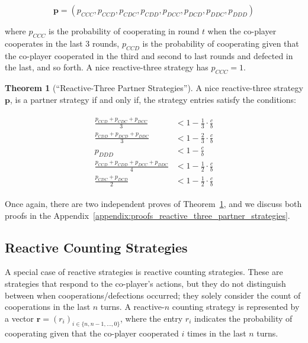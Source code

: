 \documentclass{article}
\theoremstyle{definition}
\newtheorem{theorem}{Theorem}[section]
\begin{document}
$$\mathbf{p}=(p_{CCC}, p_{CCD}, p_{CDC}, p_{CDD}, p_{DCC}, p_{DCD}, p_{DDC}, p_{DDD})$$

where $p_{CCC}$ is the probability of cooperating in round $t$ when the
co-player cooperates in the last 3 rounds, $p_{CCD}$ is the probability of
cooperating given that the co-player cooperated in the third and second to last
rounds and defected in the last, and so forth. A nice reactive-three strategy
has $p_{CCC} = 1$.

\begin{theorem}[``Reactive-Three Partner Strategies'']\label{theorem:reactive_three_partner_strategies}
A nice reactive-three strategy $\mathbf{p}$, is a partner strategy if and only if,
the strategy entries satisfy the conditions:

\begin{align}\label{eq:three_bit_conditions}
  \begin{split}
  \frac{p_{CCD} + p_{CDC} + p_{DCC}}{3} & < 1\!-\! \frac{1}{3} \cdot \frac{c}{b} \\
  \frac{p_{CDD} + p_{DCD} + p_{DDC}}{3} & < 1\!-\! \frac{2}{3} \cdot \frac{c}{b} \\
  p_{DDD} & < 1\!-\! \frac{c}{b} \\
  \frac{p_{CCD} + p_{CDD} + p_{DCC} + p_{DDC}}{4}  & < 1\!-\! \frac{1}{2} \cdot \frac{c}{b}  \\
  \frac{p_{CDC} + p_{DCD}}{2} & < 1\!-\! \frac{1}{2} \cdot \frac{c}{b}
  \end{split}
\end{align}
\end{theorem}

Once again, there are two independent proves of
Theorem~\ref{theorem:reactive_three_partner_strategies}, and we 
discuss both proofs in the Appendix~\ref{appendix:proofs_reactive_three_partner_strategies}.

\subsection{Reactive Counting Strategies}

A special case of reactive strategies is reactive counting strategies. These are
strategies that respond to the co-player's actions, but they do not distinguish
between when cooperations/defections occurred; they solely consider the count of
cooperations in the last $n$ turns. A reactive-$n$ counting strategy is represented
by a vector $\mathbf{r}=(r_i)_{i \in \{n, n -1, \dots, 0\}}$, where the entry \(r_i\)
indicates the probability of cooperating given that the co-player cooperated
\(i\) times in the last \(n\) turns.
\end{document}
